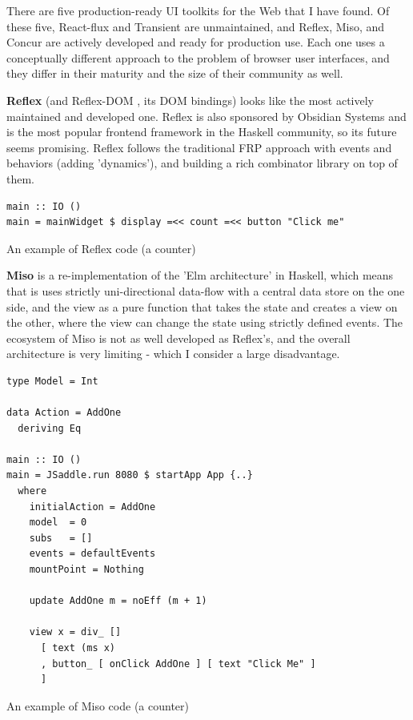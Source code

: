 \documentclass[english,odsaz]{fitthesis}
\begin{document}
There are five production-ready UI toolkits for the Web that I have found. Of
these five, React-flux and Transient are unmaintained, and Reflex, Miso, and
Concur are actively developed and ready for production use. Each one uses a
conceptually different approach to the problem of browser user interfaces, and
they differ in their maturity and the size of their community as well.

\textbf{Reflex} \cite{reflex} (and Reflex-DOM \cite{reflex-dom}, its DOM bindings) looks like
the most actively maintained and developed one. Reflex is also sponsored by
Obsidian Systems \cite{obsidian} and is the most popular frontend framework in the
Haskell community, so its future seems promising. Reflex follows the traditional
FRP approach with events and behaviors (adding 'dynamics'), and
building a rich combinator library on top of them.

\begin{listing}[htbp]
\begin{verbatim}
main :: IO ()
main = mainWidget $ display =<< count =<< button "Click me"
\end{verbatim}
\caption{An example of Reflex code (a counter)}
\end{listing}

\textbf{Miso} \cite{miso} is a re-implementation of the 'Elm architecture' in Haskell,
which means that is uses strictly uni-directional data-flow with a central data
store on the one side, and the view as a pure function that takes the state and
creates a view on the other, where the view can change the state using strictly
defined events. The ecosystem of Miso is not as well developed as Reflex's, and
the overall architecture is very limiting - which I consider a large
disadvantage.

\begin{listing}[htbp]
\begin{verbatim}
type Model = Int

data Action = AddOne
  deriving Eq

main :: IO ()
main = JSaddle.run 8080 $ startApp App {..}
  where
    initialAction = AddOne
    model  = 0
    subs   = []
    events = defaultEvents
    mountPoint = Nothing

    update AddOne m = noEff (m + 1)

    view x = div_ []
      [ text (ms x)
      , button_ [ onClick AddOne ] [ text "Click Me" ]
      ]
\end{verbatim}
\caption{An example of Miso code (a counter)}
\end{listing}
\end{document}
